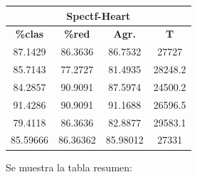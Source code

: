 \documentclass[11pt,a4paper]{article}
\theoremstyle{definition}
\begin{document}
\begin{tabbing}
{		\begin{tabular}{|c|c|c|c|}
			\hline
			\multicolumn{4}{|c|}{\textbf{Spectf-Heart}} \\ \hline
			\textbf{\%clas} & \textbf{\%red} & \textbf{Agr.} & \textbf{T} \\ \hline 
			87.1429 & 86.3636 & 86.7532 & 27727\\ \hline
85.7143 & 77.2727 & 81.4935 & 28248.2\\ \hline
84.2857 & 90.9091 & 87.5974 & 24500.2\\ \hline
91.4286 & 90.9091 & 91.1688 & 26596.5\\ \hline
79.4118 & 86.3636 & 82.8877 & 29583.1\\ \hline
85.59666 & 86.36362 & 85.98012 & 27331\\ \hline
		\end{tabular}
		}
	\end{tabbing}
	
	
	Se muestra la tabla resumen:
	
\end{document}
